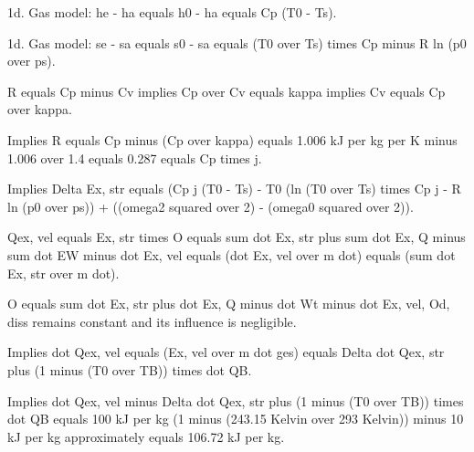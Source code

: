 1d. Gas model: he - ha equals h0 - ha equals Cp (T0 - Ts).

1d. Gas model: se - sa equals s0 - sa equals (T0 over Ts) times Cp minus R ln (p0 over ps).

R equals Cp minus Cv implies Cp over Cv equals kappa implies Cv equals Cp over kappa.

Implies R equals Cp minus (Cp over kappa) equals 1.006 kJ per kg per K minus 1.006 over 1.4 equals 0.287 equals Cp times j.

Implies Delta Ex, str equals (Cp j (T0 - Ts) - T0 (ln (T0 over Ts) times Cp j - R ln (p0 over ps)) + ((omega2 squared over 2) - (omega0 squared over 2)).

Qex, vel equals Ex, str times O equals sum dot Ex, str plus sum dot Ex, Q minus sum dot EW minus dot Ex, vel equals (dot Ex, vel over m dot) equals (sum dot Ex, str over m dot).

O equals sum dot Ex, str plus dot Ex, Q minus dot Wt minus dot Ex, vel, Od, diss remains constant and its influence is negligible.

Implies dot Qex, vel equals (Ex, vel over m dot ges) equals Delta dot Qex, str plus (1 minus (T0 over TB)) times dot QB.

Implies dot Qex, vel minus Delta dot Qex, str plus (1 minus (T0 over TB)) times dot QB equals 100 kJ per kg (1 minus (243.15 Kelvin over 293 Kelvin)) minus 10 kJ per kg approximately equals 106.72 kJ per kg.